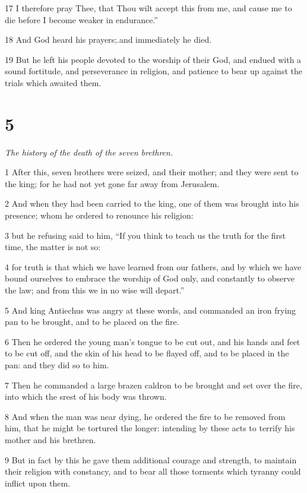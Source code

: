17 I therefore pray Thee, that Thou wilt accept this from me, and cause me to die before I become weaker in endurance.” 

18 And God heard his prayers;.and immediately he died. 

19 But he left his people devoted to the worship of their God, and endued with a sound fortitude, and perseverance in religion, and patience to bear up against the trials which awaited them. 

\chapter{5}

\par \textit{The history of the death of the seven brethren.}

1 After this, seven brothers were seized, and their mother; and they were sent to the king; for he had not yet gone far away from Jerusalem. 

2 And when they had been carried to the king, one of them was brought into his presence; whom he ordered to renounce his religion: 

3 but he refusing said to him, “If you think to teach us the truth for the first time, the matter is not so: 

4 for truth is that which we have learned from our fathers, and by which we have bound ourselves to embrace the worship of God only, and constantly to observe the law; and from this we in no wise will depart.” 

5 And king Antiechus was angry at these words, and commanded an iron frying pan to be brought, and to be placed on the fire. 

6 Then he ordered the young man’s tongue to be cut out, and his hands and feet to be cut off, and the skin of his head to be flayed off, and to be placed in the pan: and they did so to him. 

7 Then he commanded a large brazen caldron to be brought and set over the fire, into which the srest of his body was thrown. 

8 And when the man was near dying, he ordered the fire to be removed from him, that he might be tortured the longer: intending by these acts to terrify his mother and his brethren. 

9 But in fact by this he gave them additional courage and strength, to maintain their religion with constancy, and to bear all those torments which tyranny could inflict upon them. 


